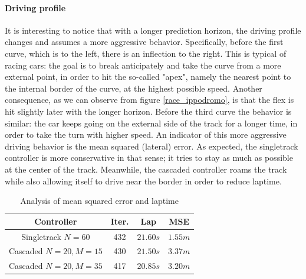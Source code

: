 \documentclass[a4paper, onecolumn, 12pt]{article}
\begin{document}
\paragraph{Driving profile}
It is interesting to notice that with a longer prediction horizon, the driving
profile changes and assumes a more aggressive behavior. Specifically, before the
first curve, which is to the left, there is an inflection to the right. This is
typical of racing cars: the goal is to break anticipately and take the curve
from a more external point, in order to hit the so-called "apex", namely the
nearest point to the internal border of the curve, at the highest possible
speed. Another consequence, as we can observe from figure \ref{race_ippodromo},
is that the flex is hit slightly later with the longer horizon. Before the third
curve the behavior is similar: the car keeps going on the external side of the
track for a longer time, in order to take the turn with higher speed. An
indicator of this more aggressive driving behavior is the mean squared (lateral)
error. As expected, the singletrack controller is more conservative in that
sense; it tries to stay as much as possible at the center of the track.
Meanwhile, the cascaded controller roams the track while also allowing itself to
drive near the border in order to reduce laptime.
\begin{table}[H]
    \centering
    \caption{Analysis of mean squared error and laptime}
    \begin{tabular}{|c||c|c|c|}
        \hline
        \textbf{Controller} & \textbf{Iter.} & \textbf{Lap} & \textbf{MSE} \\ [0.5ex] 
        \hline
        \hline
        Singletrack $N=60$ & 432 & $21.60 s$ & $1.55 m$ \\
        \hline
        Cascaded $N=20, M=15$ & 430 & $21.50 s$ & $3.37 m$ \\
        \hline
        Cascaded $N=20, M=35$ & 417 & $20.85 s$ & $3.20 m$ \\
        \hline
    \end{tabular}
\end{table}
\end{document}

